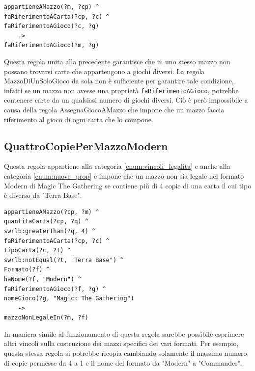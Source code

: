 \documentclass[12pt]{article}
\begin{document}
\begin{lstlisting}[language=SPARQL]
appartieneAMazzo(?m, ?cp) ^ 
faRiferimentoACarta(?cp, ?c) ^ 
faRiferimentoAGioco(?c, ?g) 
    -> 
faRiferimentoAGioco(?m, ?g)
\end{lstlisting}

Questa regola unita alla precedente garantisce che in uno stesso mazzo non possano trovarsi carte che appartengono a giochi diversi. La regola MazzoDiUnSoloGioco da sola non è sufficiente per garantire tale condizione, infatti se un mazzo non avesse una proprietà \lstinline [language=SPARQL]{faRiferimentoAGioco}, potrebbe contenere carte da un qualsiasi numero di giochi diversi. Ciò è però impossibile a causa della regola AssegnaGiocoAMazzo che impone che un mazzo faccia riferimento al gioco di ogni carta che lo compone. 

\subsection{QuattroCopiePerMazzoModern}
Questa regola appartiene alla categoria \ref{enum:vincoli_legalita} e anche alla categoria \ref{enum:nuove_prop} e impone che un mazzo non sia legale nel formato Modern di Magic The Gathering se contiene più di 4 copie di una carta il cui tipo è diverso da "Terra Base".

\begin{lstlisting}[language=SPARQL]
appartieneAMazzo(?cp, ?m) ^ 
quantitaCarta(?cp, ?q) ^
swrlb:greaterThan(?q, 4) ^
faRiferimentoACarta(?cp, ?c) ^ 
tipoCarta(?c, ?t) ^ 
swrlb:notEqual(?t, "Terra Base") ^
Formato(?f) ^ 
haNome(?f, "Modern") ^
faRiferimentoAGioco(?f, ?g) ^
nomeGioco(?g, "Magic: The Gathering")
    -> 
mazzoNonLegaleIn(?m, ?f)
\end{lstlisting}
In maniera simile al funzionamento di questa regola sarebbe possibile esprimere altri vincoli sulla costruzione dei mazzi specifici dei vari formati. Per esempio, questa stessa regola si potrebbe ricopia cambiando solamente il massimo numero di copie permesse da 4 a 1 e il nome del formato da "Modern" a "Commander".
\end{document}
